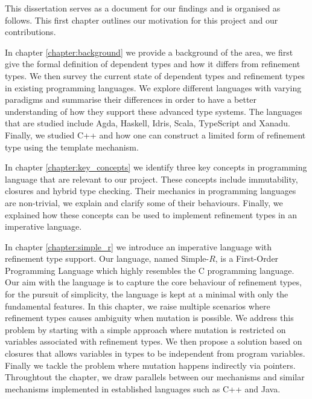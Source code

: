 \documentclass[a4paper,12pt]{report}
\begin{document}
\par
This dissertation serves as a document for our findings and is organised as 
follows. This first chapter outlines our motivation for this project and our 
contributions. 

\par
In chapter \ref{chapter:background} we provide a background of the area, we 
first give the formal definition of dependent types and how it differs 
from refinement types. We then survey the current state of 
dependent types and refinement types in existing programming languages. 
We explore different languages with varying paradigms and summarise their 
differences in order to have a better understanding of how they 
support these advanced type systems. The languages that are studied include 
Agda, Haskell, Idris, Scala, TypeScript and Xanadu. Finally, we studied 
C++ and how one can construct a limited form of refinement type using the 
template mechanism. 

\par
In chapter \ref{chapter:key_concepts} we identify three key concepts in 
programming language that are relevant to our project. These concepts include 
immutability, closures and hybrid type checking. Their mechanics in programming 
languages are non-trivial, we explain and clarify some of their behaviours. 
Finally, we explained how these concepts can be used to implement refinement 
types in an imperative language.

\par
In chapter \ref{chapter:simple_r} we introduce an imperative 
language with refinement type support. 
Our language, named Simple-$R$, is a First-Order Programming Language which 
highly resembles the C programming language. Our aim with the language is to 
capture the core behaviour of refinement types, for the pursuit 
of simplicity, the language is kept at a minimal with only the fundamental features. 
In this chapter, we raise multiple scenarios where refinement types 
causes ambiguity when mutation is possible. We address this problem by starting 
with a simple approach where mutation is restricted on variables associated with 
refinement types. We then propose a solution based on closures that allows 
variables in types to be independent from program variables. Finally we tackle 
the problem where mutation happens indirectly via pointers. Throughtout the chapter, 
we draw parallels between our mechanisms and similar mechanisms 
implemented in established languages such as C++ and Java. 
\end{document}
